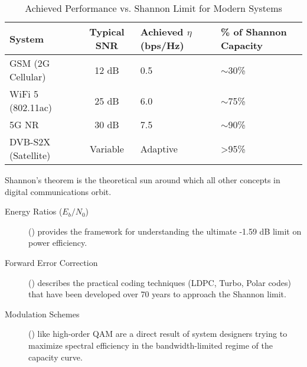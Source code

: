 \begin{table}[H]
    \centering
    \caption{Achieved Performance vs. Shannon Limit for Modern Systems}
    \label{tab:shannon-gap}
    \begin{tabularx}{\textwidth}{@{}XcXX@{}}
        \toprule
        \tableheaderfont System & \tableheaderfont Typical SNR & \tableheaderfont Achieved $\eta$ (bps/Hz) & \tableheaderfont \% of Shannon Capacity \\
        \midrule
        GSM (2G Cellular) & 12 dB & 0.5 & $\sim$30\% \\
        WiFi 5 (802.11ac) & 25 dB & 6.0 & $\sim$75\% \\
        5G NR & 30 dB & 7.5 & $\sim$90\% \\
        DVB-S2X (Satellite) & Variable & Adaptive & >95\% \\
        \bottomrule
    \end{tabularx}
\end{table}


\begin{importantbox}[title={Further Reading}]
    Shannon's theorem is the theoretical sun around which all other concepts in digital communications orbit.
    \begin{description}
        \item[Energy Ratios ($E_b/N_0$)] () provides the framework for understanding the ultimate -1.59 dB limit on power efficiency.
        \item[Forward Error Correction] () describes the practical coding techniques (LDPC, Turbo, Polar codes) that have been developed over 70 years to approach the Shannon limit.
        \item[Modulation Schemes] () like high-order QAM are a direct result of system designers trying to maximize spectral efficiency in the bandwidth-limited regime of the capacity curve.
    \end{description}
\end{importantbox}